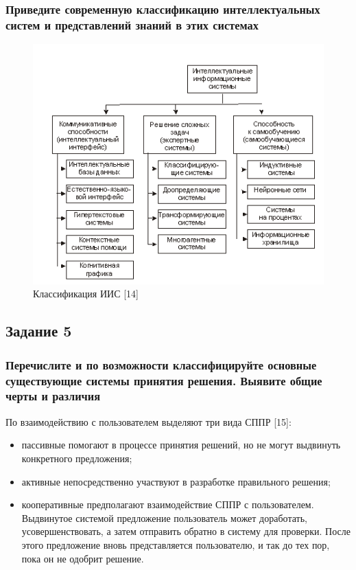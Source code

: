 \documentclass[14pt,a4paper,report]{report}
\begin{document}
\subsubsection{Приведите современную классификацию интеллектуальных систем и представлений знаний в этих системах}

\begin{figure}[h!]
	\centering
	\includegraphics[scale = 1.40]{images/iis.png}
	\caption{Классификация ИИС [14]}
	\label{image:1}
\end{figure}	


\subsection{Задание 5}

\subsubsection{Перечислите и по возможности классифицируйте основные существующие системы принятия решения. Выявите общие черты и различия}

По взаимодействию с пользователем выделяют три вида СППР [15]:

\begin{itemize}
	\item пассивные помогают в процессе принятия решений, но не могут выдвинуть конкретного предложения;
	\item активные непосредственно участвуют в разработке правильного решения;
	\item кооперативные предполагают взаимодействие СППР с пользователем. Выдвинутое системой предложение пользователь может доработать, усовершенствовать, а затем отправить обратно в систему для проверки. После этого предложение вновь представляется пользователю, и так до тех пор, пока он не одобрит решение.
\end{itemize}
\end{document}
